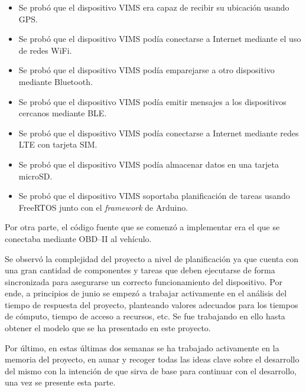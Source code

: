 \begin{itemize}
  \item Se probó que el dispositivo \ac{VIMS} era capaz de recibir su ubicación
        usando \ac{GPS}.
  \item Se probó que el dispositivo \ac{VIMS} podía conectarse a Internet mediante
        el uso de redes WiFi.
  \item Se probó que el dispositivo \ac{VIMS} podía emparejarse a otro dispositivo
        mediante Bluetooth.
  \item Se probó que el dispositivo \ac{VIMS} podía emitir mensajes a los dispositivos
        cercanos mediante \ac{BLE}.
  \item Se probó que el dispositivo \ac{VIMS} podía conectarse a Internet mediante
        redes \ac{LTE} con tarjeta SIM.
  \item Se probó que el dispositivo \ac{VIMS} podía almacenar datos en una tarjeta
        microSD.
  \item Se probó que el dispositivo \ac{VIMS} soportaba planificación de tareas
        usando FreeRTOS junto con el \textit{framework} de Arduino.
\end{itemize}

Por otra parte, el código fuente que se comenzó a implementar era el que se conectaba
mediante \ac{OBD}--II al vehículo.

Se observó la complejidad del proyecto a nivel de planificación ya que cuenta con
una gran cantidad de componentes y tareas que deben ejecutarse de forma sincronizada
para asegurarse un correcto funcionamiento del dispositivo. Por ende, a principios
de junio se empezó a trabajar activamente en el análisis del tiempo de respuesta
del proyecto, planteando valores adecuados para los tiempos de cómputo, tiempo
de acceso a recursos, etc. Se fue trabajando en ello hasta obtener el modelo que
se ha presentado en este proyecto.

Por último, en estas últimas dos semanas se ha trabajado activamente en la memoria
del proyecto, en aunar y recoger todas las ideas clave sobre el desarrollo del mismo
con la intención de que sirva de base para continuar con el desarrollo, una vez
se presente esta parte.
